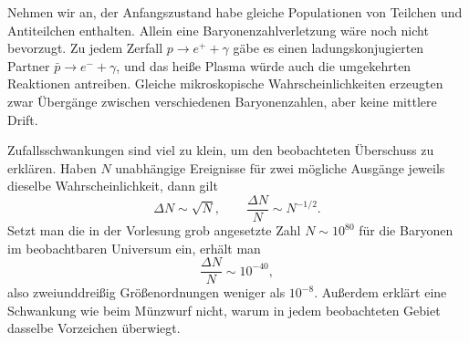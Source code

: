 \begin{classroomqa}\end{classroomqa}

Nehmen wir an, der Anfangszustand habe gleiche Populationen von Teilchen und Antiteilchen enthalten. Allein eine Baryonenzahlverletzung wäre noch nicht bevorzugt. Zu jedem Zerfall \(p\to e^++\gamma\) gäbe es einen ladungskonjugierten Partner \(\bar p\to e^-+\gamma\), und das heiße Plasma würde auch die umgekehrten Reaktionen antreiben. Gleiche mikroskopische Wahrscheinlichkeiten erzeugten zwar Übergänge zwischen verschiedenen Baryonenzahlen, aber keine mittlere Drift.

\begin{classroomqa}\end{classroomqa}

Zufallsschwankungen sind viel zu klein, um den beobachteten Überschuss zu erklären. Haben \(N\) unabhängige Ereignisse für zwei mögliche Ausgänge jeweils dieselbe Wahrscheinlichkeit, dann gilt
\begin{equation}
\Delta N\sim\sqrt N,
\qquad
\frac{\Delta N}{N}\sim N^{-1/2}.
\end{equation}
Setzt man die in der Vorlesung grob angesetzte Zahl \(N\sim10^{80}\) für die Baryonen im beobachtbaren Universum ein, erhält man
\begin{equation}
\frac{\Delta N}{N}\sim10^{-40},
\end{equation}
also zweiunddreißig Größenordnungen weniger als \(10^{-8}\). Außerdem erklärt eine Schwankung wie beim Münzwurf nicht, warum in jedem beobachteten Gebiet dasselbe Vorzeichen überwiegt.

